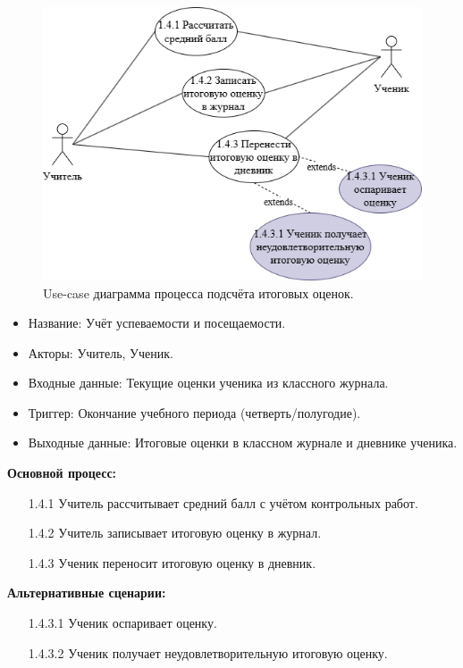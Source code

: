 \documentclass[a4paper, final]{article}
\begin{document}
\begin{figure}[H]
  \centering
  \includegraphics[width=\linewidth]{use_case24.png}
  \caption{Use-case диаграмма процесса подсчёта итоговых оценок.}
  \label{img:use_case24}
\end{figure}

\begin{itemize}
  \item Название: Учёт успеваемости и посещаемости.
  \item Акторы: Учитель, Ученик.
  \item Входные данные: Текущие оценки ученика из классного журнала.
  \item Триггер: Окончание учебного периода (четверть/полугодие).
  \item Выходные данные: Итоговые оценки в классном журнале и дневнике ученика.
\end{itemize}

\textbf{Основной процесс:}
\begin{enumerate}
  \item[1.4.1] Учитель рассчитывает средний балл с учётом контрольных работ.
  \item[1.4.2] Учитель записывает итоговую оценку в журнал.
  \item[1.4.3] Ученик переносит итоговую оценку в дневник.
\end{enumerate}

\textbf{Альтернативные сценарии:}
\begin{itemize}
  \item[1.4.3.1] Ученик оспаривает оценку.
  \item[1.4.3.2] Ученик получает неудовлетворительную итоговую оценку. 
\end{itemize}
\end{document}
